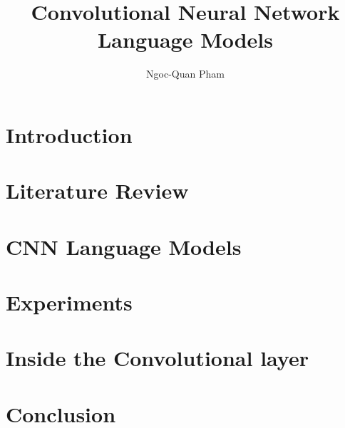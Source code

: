 \documentclass[12pt]{report}
\begin{document}
\title{Convolutional Neural Network Language Models}
\author{Ngoc-Quan Pham}

\beforepreface
%
%
\afterpreface


\chapter{Introduction}
\label{c:intro}


\chapter{Literature Review}
\label{c:review}



\chapter{CNN Language Models}
\label{c:cnn}

\chapter{Experiments}
\label{c:exp}

\chapter{Inside the Convolutional layer}
\label{c:analysis}

\chapter{Conclusion}
\label{c:conc}

\end{document}
